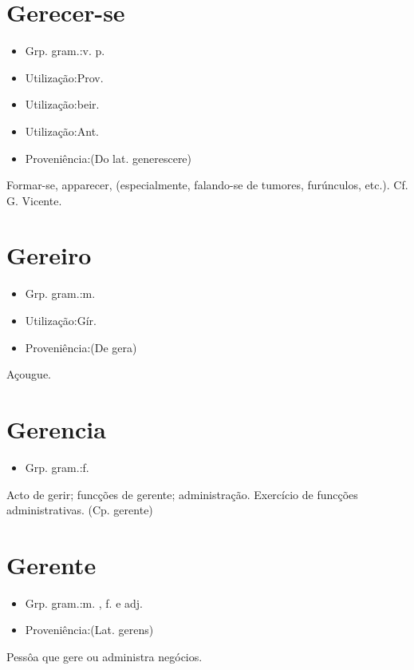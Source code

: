 \section{Gerecer-se}
\begin{itemize}
\item {Grp. gram.:v. p.}
\end{itemize}
\begin{itemize}
\item {Utilização:Prov.}
\end{itemize}
\begin{itemize}
\item {Utilização:beir.}
\end{itemize}
\begin{itemize}
\item {Utilização:Ant.}
\end{itemize}
\begin{itemize}
\item {Proveniência:(Do lat. \textunderscore generescere\textunderscore )}
\end{itemize}
Formar-se, apparecer, (especialmente, falando-se de tumores, furúnculos, etc.). Cf. G. Vicente.
\section{Gereiro}
\begin{itemize}
\item {Grp. gram.:m.}
\end{itemize}
\begin{itemize}
\item {Utilização:Gír.}
\end{itemize}
\begin{itemize}
\item {Proveniência:(De \textunderscore gera\textunderscore )}
\end{itemize}
Açougue.
\section{Gerencia}
\begin{itemize}
\item {Grp. gram.:f.}
\end{itemize}
Acto de gerir; funcções de gerente; administração.
Exercício de funcções administrativas.
(Cp. \textunderscore gerente\textunderscore )
\section{Gerente}
\begin{itemize}
\item {Grp. gram.:m. ,  f.  e  adj.}
\end{itemize}
\begin{itemize}
\item {Proveniência:(Lat. \textunderscore gerens\textunderscore )}
\end{itemize}
Pessôa que gere ou administra negócios.
